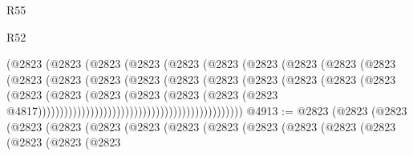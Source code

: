 \begin{lexlean}{R55}
\begin{lexlean}{R52}
\begin{coremodule}
{{{{{{{{{{{{{{{{{{{{{{{{{{{{{{{{{{{{{{{{{{{{{{{{{{{{{{{{{{{{{{{{{{{{{{{{{{{{{{{{{{{{{{{{{{{{{{{{{{{{{{{{{{{{{{{{{{{{{{{{{{{{{{{{{{{{{{{{{{{{{{{{{{{{{{{{{{{{{{{{{{{{{{{{{{{{{{{{{{{{{{{{{{{{{{{{{{{{{{                                            (@2823
                                              (@2823
                                                (@2823
                                                  (@2823
                                                    (@2823
                                                      (@2823
                                                        (@2823
                                                          (@2823
                                                            (@2823
                                                              (@2823
                                                                (@2823
                                                                  (@2823
                                                                    (@2823
                                                                      (@2823
                                                                        (@2823
                                                                          (@2823
                                                                            (@2823
                                                                              (@2823
                                                                                (@2823
                                                                                  (@2823
                                                                                    (@2823
                                                                                      (@2823
                                                                                        (@2823
                                                                                          (@2823
                                                                                            (@2823
                                                                                              (@2823
                                                                                                (@2823
                                                                                                  @4817)))))))))))))))))))))))))))))))))))))))))))))))
@4913 := @2823
    (@2823
      (@2823
        (@2823
          (@2823
            (@2823
              (@2823
                (@2823
                  (@2823
                    (@2823
                      (@2823
                        (@2823
                          (@2823
                            (@2823
                              (@2823
                                (@2823
}}}}}}}}}}}}}}}}}}}}}}}}}}}}}}}}}}}}}}}}}}}}}}}}}}}}}}}}}}}}}}}}}}}}}}}}}}}}}}}}}}}}}}}}}}}}}}}}}}}}}}}}}}}}}}}}}}}}}}}}}}}}}}}}}}}}}}}}}}}}}}}}}}}}}}}}}}}}}}}}}}}}}}}}}}}}}}}}}}}}}}}}}}}}}}}}}}}}}}
\end{coremodule}
\end{lexlean}
\end{lexlean}
